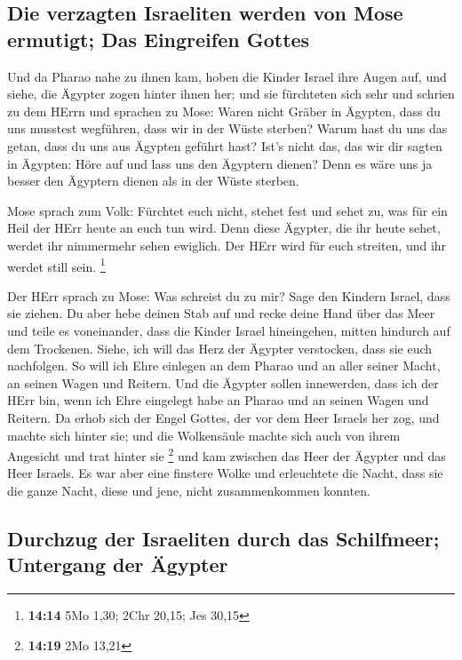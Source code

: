 \hypertarget{die-verzagten-israeliten-werden-von-mose-ermutigt-das-eingreifen-gottes}{%
\subsection{Die verzagten Israeliten werden von Mose ermutigt; Das
Eingreifen
Gottes}\label{die-verzagten-israeliten-werden-von-mose-ermutigt-das-eingreifen-gottes}}

 Und da Pharao nahe zu ihnen kam, hoben die Kinder Israel
ihre Augen auf, und siehe, die Ägypter zogen hinter ihnen her; und sie
fürchteten sich sehr und schrien zu dem HErrn  und
sprachen zu Mose: Waren nicht Gräber in Ägypten, dass du uns musstest
wegführen, dass wir in der Wüste sterben? Warum hast du uns das getan,
dass du uns aus Ägypten geführt hast?  Ist's nicht das,
das wir dir sagten in Ägypten: Höre auf und lass uns den Ägyptern
dienen? Denn es wäre uns ja besser den Ägyptern dienen als in der Wüste
sterben.

 Mose sprach zum Volk: Fürchtet euch nicht, stehet fest
und sehet zu, was für ein Heil der HErr heute an euch tun wird. Denn
diese Ägypter, die ihr heute sehet, werdet ihr nimmermehr sehen
ewiglich.  Der HErr wird für euch streiten, und ihr
werdet still sein. \footnote{\textbf{14:14} 5Mo 1,30; 2Chr 20,15; Jes
  30,15}

 Der HErr sprach zu Mose: Was schreist du zu mir? Sage
den Kindern Israel, dass sie ziehen.  Du aber hebe deinen
Stab auf und recke deine Hand über das Meer und teile es voneinander,
dass die Kinder Israel hineingehen, mitten hindurch auf dem Trockenen.
 Siehe, ich will das Herz der Ägypter verstocken, dass
sie euch nachfolgen. So will ich Ehre einlegen an dem Pharao und an
aller seiner Macht, an seinen Wagen und Reitern.  Und die
Ägypter sollen innewerden, dass ich der HErr bin, wenn ich Ehre
eingelegt habe an Pharao und an seinen Wagen und Reitern.
 Da erhob sich der Engel Gottes, der vor dem Heer Israels
her zog, und machte sich hinter sie; und die Wolkensäule machte sich
auch von ihrem Angesicht und trat hinter sie \footnote{\textbf{14:19}
  2Mo 13,21}  und kam zwischen das Heer der Ägypter und
das Heer Israels. Es war aber eine finstere Wolke und erleuchtete die
Nacht, dass sie die ganze Nacht, diese und jene, nicht zusammenkommen
konnten.

\hypertarget{durchzug-der-israeliten-durch-das-schilfmeer-untergang-der-uxe4gypter}{%
\subsection{Durchzug der Israeliten durch das Schilfmeer; Untergang der
Ägypter}\label{durchzug-der-israeliten-durch-das-schilfmeer-untergang-der-uxe4gypter}}

